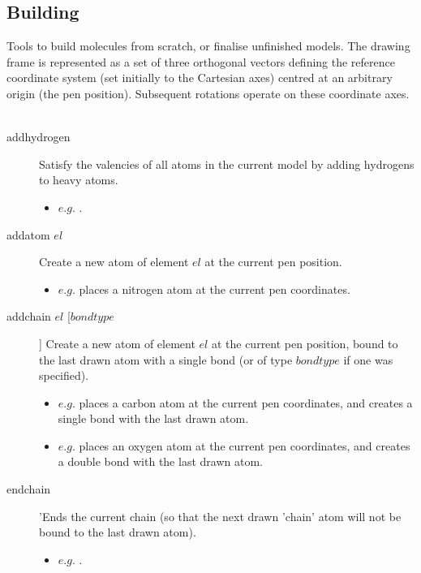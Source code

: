 \subsection{Building}
Tools to build molecules from scratch, or finalise unfinished models. The drawing frame is represented as a set of three orthogonal vectors defining the reference coordinate system (set initially to the Cartesian axes) centred at an arbitrary origin (the pen position). Subsequent rotations operate on these coordinate axes.\\\\
\begin{description}

	\item[addhydrogen\its] Satisfy the valencies of all atoms in the current model by adding hydrogens to heavy atoms.
	\begin{itemize}
		\item $e.g.$ .
	\end{itemize}

	\item[addatom $el$\its] Create a new atom of element $el$ at the current pen position.
	\begin{itemize}
		\item $e.g.$  places a nitrogen atom at the current pen coordinates.
	\end{itemize}

	\item[addchain $el$ [$bondtype$]\its] Create a new atom of element $el$ at the current pen position, bound to the last drawn atom with a single bond (or of type $bondtype$ if one was specified).
	\begin{itemize}
		\item $e.g.$  places a carbon atom at the current pen coordinates, and creates a single bond with the last drawn atom.
		\item $e.g.$  places an oxygen atom at the current pen coordinates, and creates a double bond with the last drawn atom.
	\end{itemize}

	\item[endchain\its] 'Ends the current chain (so that the next drawn 'chain' atom will not be bound to the last drawn atom).
	\begin{itemize}
		\item $e.g.$ .
	\end{itemize}


\end{description}
